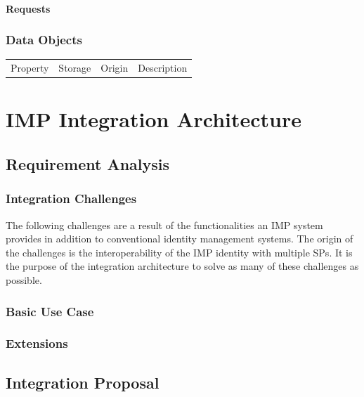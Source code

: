 \documentclass[
     12pt,         %
     a4paper,      %
     BCOR=10mm,version=first,     %
     DIV=14,version=first,        %
     ]{scrreprt}
\begin{document}
\subsubsection{Requests}

\subsection{Data Objects}

\begin{table}[!h]
    \begin{tabularx}{\textwidth}{|l|l|l|C|}
    \hline
     \\
    \hline
    Property & Storage & Origin & Description  \\
    \hline
    \hline
    \hline
    \end{tabularx}
\end{table}

\chapter{IMP Integration Architecture}

\section{Requirement Analysis}

\subsection{Integration Challenges}

The following challenges are a result of the functionalities an IMP system provides in addition to conventional identity management systems. The origin of the challenges is the interoperability of the IMP identity with multiple SPs. It is the purpose of the integration architecture to solve as many of these challenges as possible.

\subsection{Basic Use Case}

\subsection{Extensions}

\section{Integration Proposal}
\end{document}
